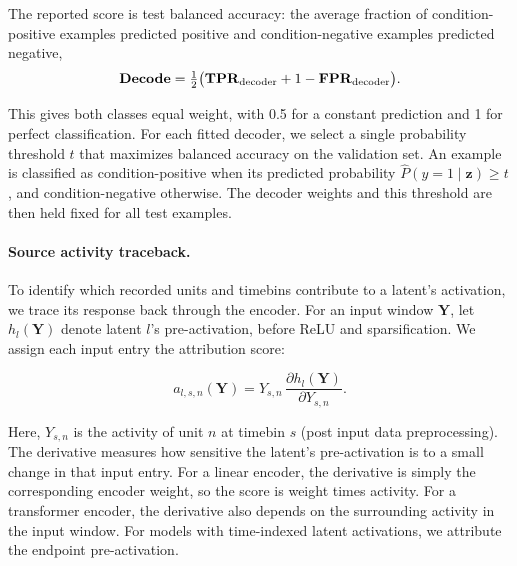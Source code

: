 The reported  score is test balanced accuracy: the average fraction of condition-positive examples predicted positive and condition-negative examples predicted negative,
\begin{equation}
\label{eq:latent_decode_balanced_accuracy}
\mathbf{Decode}=\tfrac12\bigl(\mathbf{TPR}_{\mathrm{decoder}}+1-\mathbf{FPR}_{\mathrm{decoder}}\bigr).
\end{equation}

This gives both classes equal weight, with 0.5 for a constant prediction and 1 for perfect classification. For each fitted decoder, we select a single probability threshold $t$ that maximizes balanced accuracy on the validation set. An example is classified as condition-positive when its predicted probability $\widehat P(y=1\mid\mathbf z)\ge t$, and condition-negative otherwise. The decoder weights and this threshold are then held fixed for all test examples. 

\paragraph{Source activity traceback.}
\label{paragraph:source_activity_traceback}

To identify which recorded units and timebins contribute to a latent's activation, we trace its response back through the encoder. For an input window $\mathbf{Y}$, let $h_l(\mathbf{Y})$ denote latent $l$'s pre-activation, before ReLU and sparsification. We assign each input entry the attribution score:

\begin{equation}
\label{eq:source_activity_traceback}
a_{l,s,n}(\mathbf{Y})=Y_{s,n}\,\frac{\partial h_l(\mathbf{Y})}{\partial Y_{s,n}}.
\end{equation}

Here, $Y_{s,n}$ is the activity of unit $n$ at timebin $s$ (post input data preprocessing). The derivative measures how sensitive the latent's pre-activation is to a small change in that input entry. For a linear encoder, the derivative is simply the corresponding encoder weight, so the score is weight times activity. For a transformer encoder, the derivative also depends on the surrounding activity in the input window. For models with time-indexed latent activations, we attribute the endpoint pre-activation.


